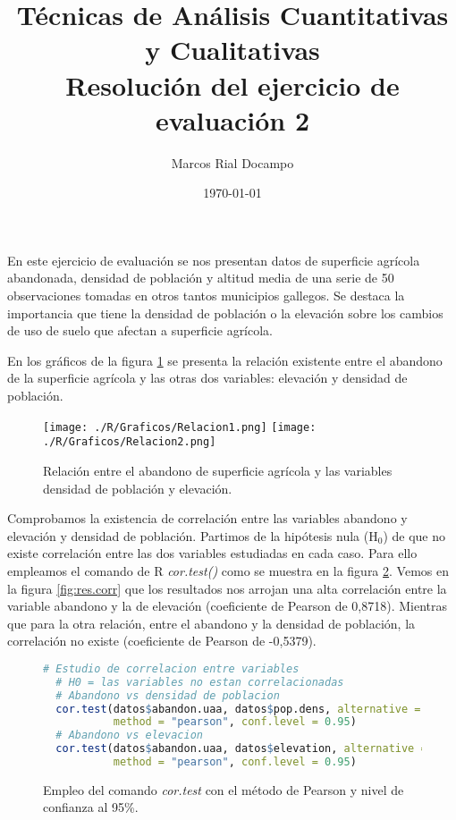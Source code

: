 \documentclass[11pt,a4paper]{article}
\author{Marcos Rial Docampo}
\title{Técnicas de Análisis Cuantitativas y Cualitativas\\Resolución del ejercicio de evaluación 2}
\date{\small{\today}}
\begin{document}
\maketitle

En este ejercicio de evaluación se nos presentan datos de superficie agrícola abandonada, densidad de población y altitud media de una serie de 50 observaciones tomadas en otros tantos municipios gallegos. Se destaca la importancia que tiene la densidad de población o la elevación sobre los cambios de uso de suelo que afectan a superficie agrícola.

En los gráficos de la figura \ref{fig:graficas} se presenta la relación existente entre el abandono de la superficie agrícola y las otras dos variables: elevación y densidad de población.

\begin{figure}
	\centering
	\texttt{[image: ./R/Graficos/Relacion1.png]}
	\texttt{[image: ./R/Graficos/Relacion2.png]}
	\caption{Relación entre el abandono de superficie agrícola y las variables densidad de población y elevación.}
	\label{fig:graficas}
\end{figure}

Comprobamos la existencia de correlación entre las variables abandono y elevación y densidad de población. Partimos de la hipótesis nula (H$_0$) de que no existe correlación entre las dos variables estudiadas en cada caso. Para ello empleamos el comando de R \textit{cor.test()} como se muestra en la figura \ref{fig:cor.test}. Vemos en la figura \ref{fig:res.corr} que los resultados nos arrojan una alta correlación entre la variable abandono y la de elevación (coeficiente de Pearson de 0,8718). Mientras que para la otra relación, entre el abandono y la densidad de población, la correlación no existe (coeficiente de Pearson de -0,5379).

\begin{figure}
\centering
\begin{lstlisting}[language = R]
  # Estudio de correlacion entre variables
  # H0 = las variables no estan correlacionadas
  # Abandono vs densidad de poblacion
  cor.test(datos$abandon.uaa, datos$pop.dens, alternative = "greater",
           method = "pearson", conf.level = 0.95)
  # Abandono vs elevacion
  cor.test(datos$abandon.uaa, datos$elevation, alternative = "greater",
           method = "pearson", conf.level = 0.95)
\end{lstlisting}
\caption{Empleo del comando \textit{cor.test} con el método de Pearson y nivel de confianza al 95\%.}
\label{fig:cor.test}
\end{figure}
\end{document}
